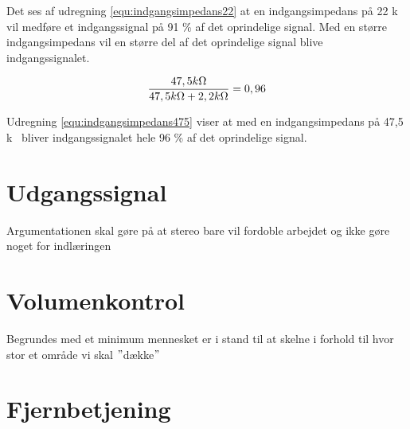 Det ses af udregning \ref{equ:indgangsimpedans22} at en indgangsimpedans på 22 k\ohm~ vil medføre et indgangssignal på 91 \% af det oprindelige signal. Med en større indgangsimpedans vil en større del af det oprindelige signal blive indgangssignalet. 

\begin{equation}
\label{equ:indgangsimpedans475}
\frac{47,5 k\ohm}{47,5 k\ohm + 2,2 k\ohm} = 0,96
\end{equation}

Udregning \ref{equ:indgangsimpedans475} viser at med en indgangsimpedans på 47,5 k\ohm~ bliver indgangssignalet hele 96 \% af det oprindelige signal.

\section{Udgangssignal}
\label{krav_udgangssignal}
Argumentationen skal gøre på at stereo bare vil fordoble arbejdet og ikke gøre noget for indlæringen

\section{Volumenkontrol}
\label{krav_volumenkontrol}
Begrundes med et minimum mennesket er i stand til at skelne i forhold til hvor stor et område vi skal $"$dække$"$

\section{Fjernbetjening}
\label{krav_fjernbetjening}
